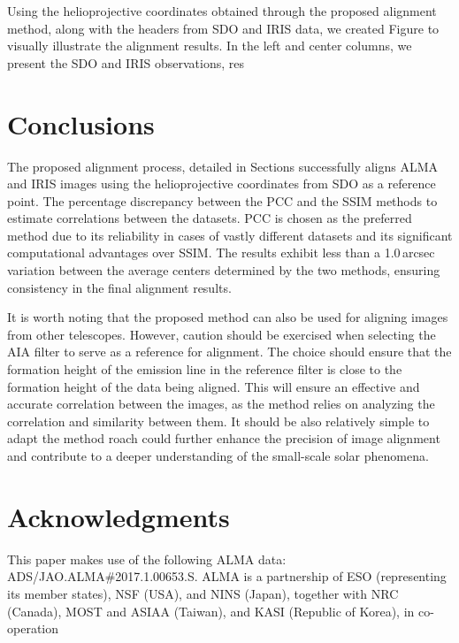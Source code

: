 \documentclass[a4paper,alpha-refs]{eSpectra}
\begin{document}
Using the helioprojective coordinates obtained through the proposed alignment method, along with the headers from SDO and IRIS data, we created Figure  to visually illustrate the alignment results. In the left and center columns, we present the SDO and IRIS observations, res

 

\section{Conclusions}
The proposed alignment process, detailed in   Sections
successfully aligns ALMA and IRIS images using the helioprojective coordinates from SDO as a reference point. The percentage discrepancy between  the PCC and the SSIM methods to estimate correlations between the datasets. PCC is chosen as the preferred method due to its reliability in cases of vastly different datasets and its significant computational advantages over SSIM. The results exhibit less than a 1.0\,arcsec variation between the average centers determined by the two methods, ensuring consistency in the final alignment results.


It is worth noting that the proposed method can also be used for aligning images from other telescopes. However, caution should be exercised when selecting the AIA filter to serve as a reference for alignment. The choice should ensure that the formation height of the emission line in the reference filter is close to the formation height of the data being aligned. This will ensure an effective and accurate correlation between the images, as the method relies on analyzing the correlation and similarity between them. It should be also relatively simple to adapt the method roach could further enhance the precision of image alignment and contribute to a deeper understanding of the small-scale solar phenomena.







\section*{Acknowledgments}
This paper makes use of the following ALMA data: ADS/JAO.ALMA\#2017.1.00653.S. ALMA is a partnership of ESO (representing its member states), NSF (USA), and NINS (Japan), together with NRC (Canada), MOST and ASIAA (Taiwan), and KASI (Republic of Korea), in co-operation 
\end{document}
